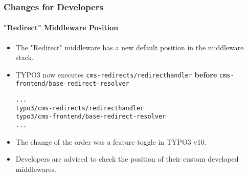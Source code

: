%

\begin{frame}[fragile]
	\frametitle{Changes for Developers}
	\framesubtitle{"Redirect" Middleware Position}

	\lstset{basicstyle=\tiny\ttfamily}

	\begin{itemize}
		\item The "Redirect" middleware has a new default position in the middleware stack.
		\item TYPO3 now executes
			\small\texttt{cms-redirects/redirecthandler}\normalsize\newline
			\textbf{before}
			\texttt{cms-frontend/base-redirect-resolver}\normalsize
\begin{lstlisting}
...
typo3/cms-redirects/redirecthandler
typo3/cms-frontend/base-redirect-resolver
...
\end{lstlisting}

		\item The change of the order was a feature toggle in TYPO3 v10.
		\item Developers are adviced to check the position of their custom developed middlewares.

	\end{itemize}

\end{frame}

